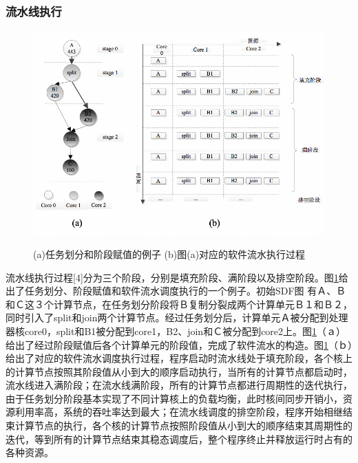 \subsubsection{流水线执行}

\begin{figure}[htbp]
  \centering
  \includegraphics[width=1.0\textwidth]{Img/Chap_Application/Yu/streamline.png}\\
  \caption{(a)任务划分和阶段赋值的例子 (b)图(a)对应的软件流水执行过程}\label{fig:streamline}
\end{figure}

流水线执行过程[4]分为三个阶段，分别是填充阶段、满阶段以及排空阶段。图\ref{fig:streamline}给出了任务划分、阶段赋值和软件流水调度执行的一个例子。初始SDF图 有Ａ、Ｂ和Ｃ这３个计算节点，在任务划分阶段将Ｂ复制分裂成两个计算单元Ｂ１和Ｂ２，同时引入了split和join两个计算节点。经过任务划分后，计算单元Ａ被分配到处理器核core0，split和B1被分配到core1，B2、join和Ｃ被分配到core2上。图\ref{fig:streamline}（ａ）给出了经过阶段赋值后各个计算单元的阶段值，完成了软件流水的构造。图\ref{fig:streamline}（ｂ）给出了对应的软件流水调度执行过程，程序启动时流水线处于填充阶段，各个核上的计算节点按照其阶段值从小到大的顺序启动执行，当所有的计算节点都启动时，流水线进入满阶段；在流水线满阶段，所有的计算节点都进行周期性的迭代执行，由于任务划分阶段基本实现了不同计算核上的负载均衡，此时核间同步开销小，资源利用率高，系统的吞吐率达到最大；在流水线调度的排空阶段，程序开始相继结束计算节点的执行，各个核的计算节点按照阶段值从小到大的顺序结束其周期性的迭代，等到所有的计算节点结束其稳态调度后，整个程序终止并释放运行时占有的各种资源。

